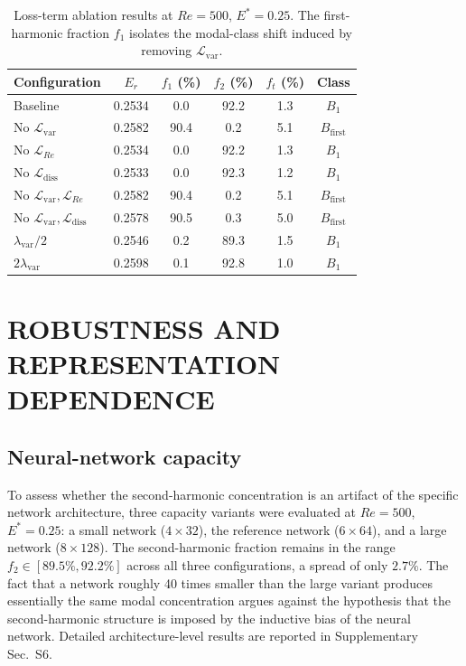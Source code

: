 \documentclass[a4paper,11pt]{article}
\begin{document}
\begin{table}[t]
\centering
\caption{Loss-term ablation results at \(Re=500\), \(E^*=0.25\). The
first-harmonic fraction \(f_1\) isolates the modal-class shift induced by removing
\(\mathcal{L}_{\mathrm{var}}\).}
\label{tab:loss_ablation}
\small
\begin{tabular}{lccccc}
\toprule
Configuration & \(E_r\) & \(f_1\) (\%) & \(f_2\) (\%) & \(f_t\) (\%) & Class\\
\midrule
Baseline & 0.2534 & 0.0 & 92.2 & 1.3 & \(B_1\)\\
No \(\mathcal{L}_{\mathrm{var}}\) & 0.2582 & 90.4 & 0.2 & 5.1 & \(B_{\mathrm{first}}\)\\
No \(\mathcal{L}_{Re}\) & 0.2534 & 0.0 & 92.2 & 1.3 & \(B_1\)\\
No \(\mathcal{L}_{\mathrm{diss}}\) & 0.2533 & 0.0 & 92.3 & 1.2 & \(B_1\)\\
No \(\mathcal{L}_{\mathrm{var}},\mathcal{L}_{Re}\) & 0.2582 & 90.4 & 0.2 & 5.1 & \(B_{\mathrm{first}}\)\\
No \(\mathcal{L}_{\mathrm{var}},\mathcal{L}_{\mathrm{diss}}\) & 0.2578 & 90.5 & 0.3 & 5.0 & \(B_{\mathrm{first}}\)\\
\(\lambda_{\mathrm{var}}/2\) & 0.2546 & 0.2 & 89.3 & 1.5 & \(B_1\)\\
\(2\lambda_{\mathrm{var}}\) & 0.2598 & 0.1 & 92.8 & 1.0 & \(B_1\)\\
\bottomrule
\end{tabular}
\end{table}

\section{ROBUSTNESS AND REPRESENTATION DEPENDENCE}
\label{sec:robustness}

\subsection{Neural-network capacity}

To assess whether the second-harmonic concentration is an artifact of the specific
network architecture, three capacity variants were evaluated at \(Re=500\),
\(E^*=0.25\): a small network (\(4\times32\)), the reference network
(\(6\times64\)), and a large network (\(8\times128\)). The second-harmonic fraction
remains in the range \(f_2\in[89.5\%,92.2\%]\) across all three configurations,
a spread of only \(2.7\%\). The fact that a network roughly 40 times smaller than
the large variant produces essentially the same modal concentration argues against
the hypothesis that the second-harmonic structure is imposed by the inductive bias
of the neural network. Detailed architecture-level results are reported in
Supplementary Sec.~S6.
\end{document}
